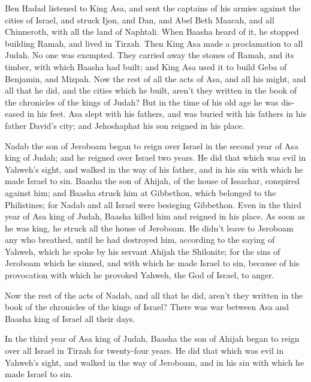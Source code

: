 \begin{paracol}{2}
\begin{otherlanguage}{english}
 Ben Hadad listened to King Asa, and sent the captains of
his armies against the cities of Israel, and struck Ijon, and Dan, and
Abel Beth Maacah, and all Chinneroth, with all the land of Naphtali.
 When Baasha heard of it, he stopped building Ramah, and
lived in Tirzah.  Then King Asa made a proclamation to
all Judah. No one was exempted. They carried away the stones of Ramah,
and its timber, with which Baasha had built; and King Asa used it to
build Geba of Benjamin, and Mizpah.  Now the rest of all
the acts of Asa, and all his might, and all that he did, and the cities
which he built, aren't they written in the book of the chronicles of the
kings of Judah? But in the time of his old age he was diseased in his
feet.  Asa slept with his fathers, and was buried with
his fathers in his father David's city; and Jehoshaphat his son reigned
in his place.

 Nadab the son of Jeroboam began to reign over Israel in
the second year of Asa king of Judah; and he reigned over Israel two
years.  He did that which was evil in Yahweh's sight, and
walked in the way of his father, and in his sin with which he made
Israel to sin.  Baasha the son of Ahijah, of the house of
Issachar, conspired against him; and Baasha struck him at Gibbethon,
which belonged to the Philistines; for Nadab and all Israel were
besieging Gibbethon.  Even in the third year of Asa king
of Judah, Baasha killed him and reigned in his place.  As
soon as he was king, he struck all the house of Jeroboam. He didn't
leave to Jeroboam any who breathed, until he had destroyed him,
according to the saying of Yahweh, which he spoke by his servant Ahijah
the Shilonite;  for the sins of Jeroboam which he sinned,
and with which he made Israel to sin, because of his provocation with
which he provoked Yahweh, the God of Israel, to anger.

 Now the rest of the acts of Nadab, and all that he did,
aren't they written in the book of the chronicles of the kings of
Israel?  There was war between Asa and Baasha king of
Israel all their days.

 In the third year of Asa king of Judah, Baasha the son
of Ahijah began to reign over all Israel in Tirzah for twenty-four
years.  He did that which was evil in Yahweh's sight, and
walked in the way of Jeroboam, and in his sin with which he made Israel
to sin.


\end{otherlanguage}
\end{paracol}
